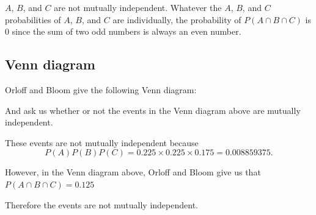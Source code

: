 \documentclass[a4paper,11pt]{article}
\begin{document}
$A$, $B$, and $C$ are not mutually independent.  Whatever the
$A$, $B$, and $C$ probabilities of $A$, $B$, and $C$ are individually, the
probability of  $P \left( A \cap B \cap C\right)$ is $0$ since the sum of two
odd numbers is always an even number.

\subsection{Venn diagram}

Orloff and Bloom give the following Venn diagram:

\def\firstcircle{(0,0) circle (1.5cm)}
\def\secondcircle{(45:2cm) circle (1.5cm)}
\def\thirdcircle{(0:2cm) circle (1.5cm)}

\begin{center}
\end{center}

And ask us whether or not the events in the Venn diagram above are mutually
independent.

These events are not mutually independent because
\begin{equation}
	P \left(A \right) P \left(B \right) P \left( C \right) =
		0.225 \times 0.225 \times 0.175 = 0.008859375.
\end{equation}

However, in the Venn diagram above, Orloff and Bloom give us that
$P \left( A \cap B \cap C\right) = 0.125$

Therefore the events are not mutually independent.
\end{document}
